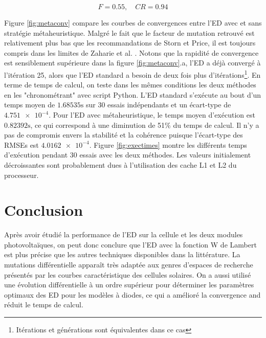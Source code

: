 \begin{equation}
  F = 0.55, \quad CR = 0.94
\end{equation}

Figure \ref{fig:metaconv} compare les courbes de convergences entre l'ED avec et sans stratégie métaheuristique. Malgré le fait que le facteur de mutation retrouvé est relativement plus bas que les recommandations de Storn et Price, il est toujours compris dans les limites de Zaharie et al. \cite{Zaharie2002}. Notons que la rapidité de convergence est sensiblement supérieure dans la figure \ref{fig:metaconv}.a, l'ED a déjà convergé à l'itération 25, alors que l'ED standard a besoin de deux fois plus d'itérations\footnote{Itérations et générations sont équivalentes dans ce cas}. En terme de temps de calcul, on teste dans les mêmes conditions les deux méthodes en les "chronométrant" avec script Python. L'ED standard s'exécute au bout d'un temps moyen de $1.68535 \si{\second}$ sur 30 essais indépendants et un écart-type de $\num{4.751e-4}$. Pour l'ED avec métaheuristique, le temps moyen d'exécution est $0.82392 \si{\second}$, ce qui correspond à une diminution de 51\% du temps de calcul. Il n'y a pas de compromis envers la stabilité et la cohérence puisque l'écart-type des RMSEs est $\num{4.0162e-4}$. Figure \ref{fig:exectimes} montre les différents temps d'exécution pendant 30 essais avec les deux méthodes. Les valeurs initialement décroissantes sont probablement dues à l'utilisation des cache L1 et L2 du processeur.

\section{Conclusion}
Après avoir étudié la performance de l'ED sur la cellule et les deux modules photovoltaïques, on peut donc conclure que l'ED avec la fonction W de Lambert est plus précise que les autres techniques disponibles dans la littérature. La mutations différentielle apparaît très adaptée aux genres d'espaces de recherche présentés par les courbes caractéristique des cellules solaires. On a aussi utilisé une évolution différentielle à un ordre supérieur pour déterminer les paramètres optimaux des ED pour les modèles à diodes, ce qui a amélioré la convergence and réduit le temps de calcul.

